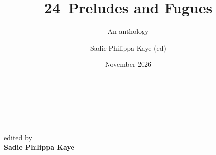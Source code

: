 \documentclass[10pt]{book}
\title{24~Preludes and Fugues}
\subtitle{An anthology}
\author{Sadie Philippa Kaye (ed)}
\date{November 2026}
\begin{document}
\raggedright
\parskip 6pt
\parindent 0pt

\frontmatter
\pagestyle{empty}
\setcounter{page}{1}

\vspace*{5cm}
\begin{center}
  \Large{\sc \thetitle}\\[3mm]
  \large{\it \thesubtitle}
\end{center}

\clearpage

\vspace*{5cm}

\begin{center}

\end{center}

\clearpage

\vspace*{5cm}
\begin{center}
  \huge{\bf \thetitle}\\[3mm]
  \Large{\it \thesubtitle}\\[1cm]
  \large{
    edited by\\[6pt]{\bf Sadie Philippa Kaye}
  }
  
\end{center}

\clearpage
\end{document}
